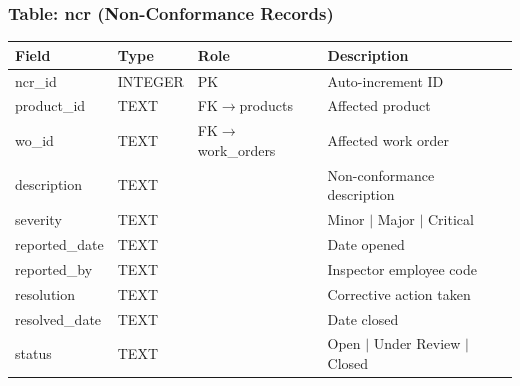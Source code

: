 \documentclass[11pt]{article}
\begin{document}
\subsubsection*{Table: ncr (Non-Conformance Records)}
\begin{table}[H]\centering\small
\begin{tabular}{@{} l l l L{5.0cm} @{}}
\toprule
\textbf{Field} & \textbf{Type} & \textbf{Role} & \textbf{Description} \\
\midrule
ncr\_id        & INTEGER & PK  & Auto-increment ID \\
product\_id    & TEXT    & FK$\to$products & Affected product \\
wo\_id         & TEXT    & FK$\to$work\_orders & Affected work order \\
description    & TEXT    &     & Non-conformance description \\
severity       & TEXT    &     & Minor $\mid$ Major $\mid$ Critical \\
reported\_date & TEXT    &     & Date opened \\
reported\_by   & TEXT    &     & Inspector employee code \\
resolution     & TEXT    &     & Corrective action taken \\
resolved\_date & TEXT    &     & Date closed \\
status         & TEXT    &     & Open $\mid$ Under Review $\mid$ Closed \\
\bottomrule
\end{tabular}
\end{table}
\end{document}
